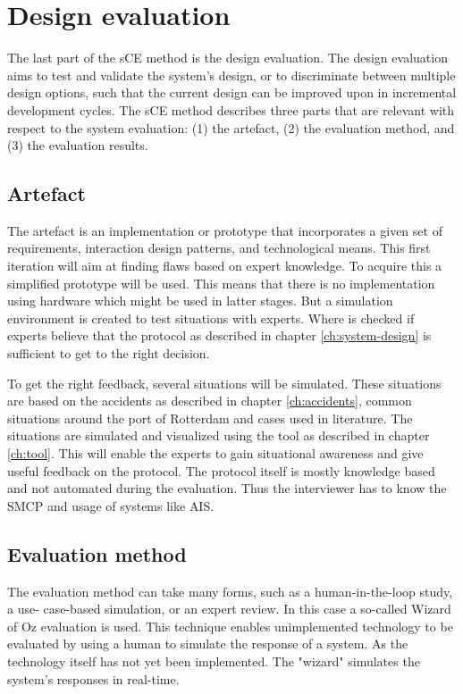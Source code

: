 \chapter{Design evaluation}
The last part of the sCE method is the design evaluation. The design evaluation aims to test and validate the system’s design, or to discriminate between multiple design options, such that the current design can be improved upon in incremental development cycles. The sCE method describes three parts that are relevant with respect to the system evaluation: (1) the artefact, (2) the evaluation method, and (3) the evaluation results.


\section{Artefact}
The artefact is an implementation or prototype that incorporates a given set of requirements, interaction design patterns, and technological means. This first iteration will aim at finding flaws based on expert knowledge. To acquire this a simplified prototype will be used. This means that there is no implementation using hardware which might be used in latter stages. But a simulation environment is created to test situations with experts. Where is checked if experts believe that the protocol as described in chapter \ref{ch:system-design} is sufficient to get to the right decision. 

To get the right feedback, several situations will be simulated. These situations are based on the accidents as described in chapter \ref{ch:accidents}, common situations around the port of Rotterdam and cases used in literature. The situations are simulated and visualized using the tool as described in chapter \ref{ch:tool}. This will enable the experts to gain situational awareness and give useful feedback on the protocol. The protocol itself is mostly knowledge based and not automated during the evaluation. Thus the interviewer has to know the \acf{SMCP} and usage of systems like \acf{AIS}.


\section{Evaluation method}
The evaluation method can take many forms, such as a human-in-the-loop study, a use- case-based simulation, or an expert review. In this case a so-called Wizard of Oz evaluation is used. This technique enables unimplemented technology to be evaluated by using a human to simulate the response of a system. As the technology itself has not yet been implemented. The "wizard" simulates the system's responses in real-time.

